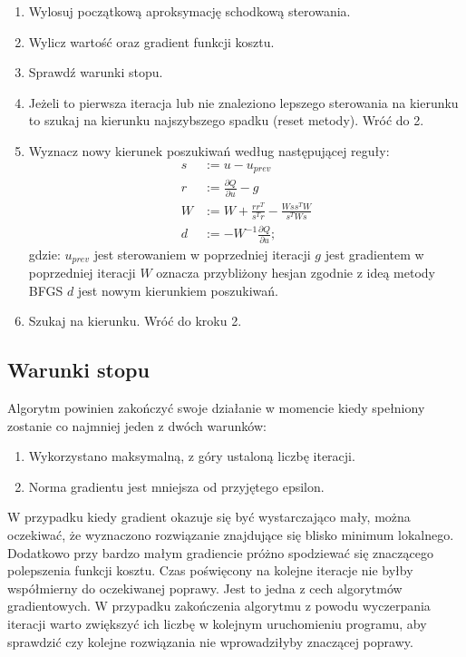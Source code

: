 \begin{enumerate}
\item Wylosuj początkową aproksymację schodkową sterowania.
\item Wylicz wartość oraz gradient funkcji kosztu.
\item Sprawdź warunki stopu.
\item Jeżeli to pierwsza iteracja lub nie znaleziono lepszego sterowania na kierunku to szukaj na kierunku najszybszego spadku (reset metody). Wróć do 2.
\item Wyznacz nowy kierunek poszukiwań według następującej reguły:
\begin{equation}
\begin{aligned}
s &:= u - u_{prev}\\
r &:= \frac{\partial Q}{\partial u} - g\\
W &:= W + \frac{rr^T}{s^Tr} - \frac{Wss^TW}{s^TWs}\\
d &:= -W^{-1}\frac{\partial Q}{\partial u};
\end{aligned}
\end{equation}
\noindent gdzie:\newline
\(u_{prev}\) jest sterowaniem w poprzedniej iteracji\newline
\(g\) jest gradientem w poprzedniej iteracji\newline
\(W\) oznacza przybliżony hesjan zgodnie z ideą metody BFGS\newline
\(d\) jest nowym kierunkiem poszukiwań.
\item Szukaj na kierunku. Wróć do kroku 2.
\end{enumerate}

\subsection{Warunki stopu}
Algorytm powinien zakończyć swoje działanie w momencie kiedy spełniony zostanie co najmniej jeden z dwóch warunków: 
\begin{enumerate}
\item Wykorzystano maksymalną, z góry ustaloną liczbę iteracji.
\item Norma gradientu jest mniejsza od przyjętego epsilon.
\end{enumerate}
W przypadku kiedy gradient okazuje się być wystarczająco mały, można oczekiwać, że wyznaczono rozwiązanie znajdujące się blisko minimum lokalnego. Dodatkowo przy bardzo małym gradiencie próżno spodziewać się znaczącego polepszenia funkcji kosztu. Czas poświęcony na kolejne iteracje nie byłby współmierny do oczekiwanej poprawy. Jest to jedna z cech algorytmów gradientowych. W przypadku zakończenia algorytmu z powodu wyczerpania iteracji warto zwiększyć ich liczbę w kolejnym uruchomieniu programu, aby sprawdzić czy kolejne rozwiązania nie wprowadziłyby znaczącej poprawy.

